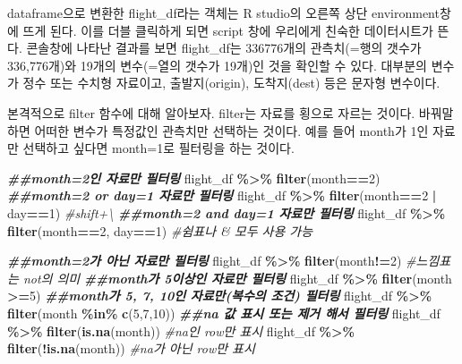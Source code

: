 \documentclass[
]{book}
\newenvironment{Shaded}{\begin{snugshade}}{\end{snugshade}}
\newcommand{\CommentTok}[1]{\textcolor[rgb]{0.56,0.35,0.01}{\textit{#1}}}
\newcommand{\DecValTok}[1]{\textcolor[rgb]{0.00,0.00,0.81}{#1}}
\newcommand{\DocumentationTok}[1]{\textcolor[rgb]{0.56,0.35,0.01}{\textbf{\textit{#1}}}}
\newcommand{\FunctionTok}[1]{\textcolor[rgb]{0.13,0.29,0.53}{\textbf{#1}}}
\newcommand{\NormalTok}[1]{#1}
\newcommand{\SpecialCharTok}[1]{\textcolor[rgb]{0.81,0.36,0.00}{\textbf{#1}}}
\begin{document}
dataframe으로 변환한 flight\_df라는 객체는 R studio의 오른쪽 상단 environment창에 뜨게 된다. 이를 더블 클릭하게 되면 script 창에 우리에게 친숙한 데이터시트가 뜬다. 콘솔창에 나타난 결과를 보면 flight\_df는 336776개의 관측치(=행의 갯수가 336,776개)와 19개의 변수(=열의 갯수가 19개)인 것을 확인할 수 있다. 대부분의 변수가 정수 또는 수치형 자료이고, 출발지(origin), 도착지(dest) 등은 문자형 변수이다.

본격적으로 filter 함수에 대해 알아보자. filter는 자료를 횡으로 자르는 것이다. 바꿔말하면 어떠한 변수가 특정값인 관측치만 선택하는 것이다. 예를 들어 month가 1인 자료만 선택하고 싶다면 month=1로 필터링을 하는 것이다.

\begin{Shaded}
\begin{Highlighting}[]
\DocumentationTok{\#\#month=2인 자료만 필터링}
\NormalTok{flight\_df }\SpecialCharTok{\%\textgreater{}\%} 
  \FunctionTok{filter}\NormalTok{(month}\SpecialCharTok{==}\DecValTok{2}\NormalTok{)}
\DocumentationTok{\#\#month=2 or day=1 자료만 필터링}
\NormalTok{flight\_df }\SpecialCharTok{\%\textgreater{}\%} 
  \FunctionTok{filter}\NormalTok{(month}\SpecialCharTok{==}\DecValTok{2} \SpecialCharTok{|}\NormalTok{ day}\SpecialCharTok{==}\DecValTok{1}\NormalTok{)   }\CommentTok{\#shift+\textbackslash{}}
\DocumentationTok{\#\#month=2 and day=1 자료만 필터링}
\NormalTok{flight\_df }\SpecialCharTok{\%\textgreater{}\%} 
  \FunctionTok{filter}\NormalTok{(month}\SpecialCharTok{==}\DecValTok{2}\NormalTok{, day}\SpecialCharTok{==}\DecValTok{1}\NormalTok{) }\CommentTok{\#쉼표나 \& 모두 사용 가능}

\DocumentationTok{\#\#month=2가 아닌 자료만 필터링}
\NormalTok{flight\_df }\SpecialCharTok{\%\textgreater{}\%} 
  \FunctionTok{filter}\NormalTok{(month}\SpecialCharTok{!=}\DecValTok{2}\NormalTok{)  }\CommentTok{\#느낌표는 not의 의미}
\DocumentationTok{\#\#month가 5이상인 자료만 필터링}
\NormalTok{flight\_df }\SpecialCharTok{\%\textgreater{}\%} 
  \FunctionTok{filter}\NormalTok{(month }\SpecialCharTok{\textgreater{}=}\DecValTok{5}\NormalTok{) }
\DocumentationTok{\#\#month가 5, 7, 10인 자료만(복수의 조건) 필터링}
\NormalTok{flight\_df }\SpecialCharTok{\%\textgreater{}\%} 
  \FunctionTok{filter}\NormalTok{(month }\SpecialCharTok{\%in\%} \FunctionTok{c}\NormalTok{(}\DecValTok{5}\NormalTok{,}\DecValTok{7}\NormalTok{,}\DecValTok{10}\NormalTok{))}
\DocumentationTok{\#\#na 값 표시 또는 제거 해서 필터링}
\NormalTok{flight\_df }\SpecialCharTok{\%\textgreater{}\%} 
  \FunctionTok{filter}\NormalTok{(}\FunctionTok{is.na}\NormalTok{(month)) }\CommentTok{\#na인 row만 표시}
\NormalTok{flight\_df }\SpecialCharTok{\%\textgreater{}\%} 
  \FunctionTok{filter}\NormalTok{(}\SpecialCharTok{!}\FunctionTok{is.na}\NormalTok{(month)) }\CommentTok{\#na가 아닌 row만 표시}
\end{Highlighting}
\end{Shaded}
\end{document}
